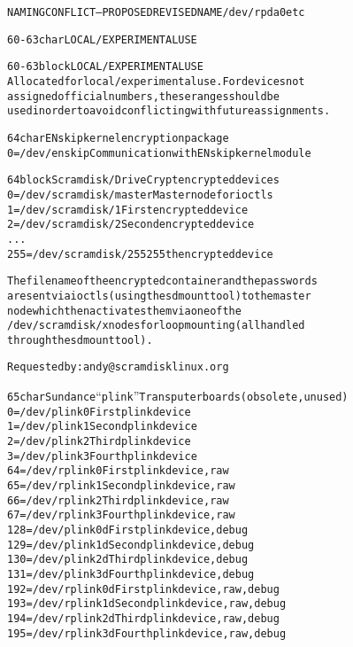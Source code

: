 \documentclass[a4paper,8pt,english]{sphinxmanual}
\begin{document}
\begin{alltt}
                NAMING CONFLICT -- PROPOSED REVISED NAME /dev/rpda0 etc

  60-63 char    LOCAL/EXPERIMENTAL USE

  60-63 block   LOCAL/EXPERIMENTAL USE
                Allocated for local/experimental use.  For devices not
                assigned official numbers, these ranges should be
                used in order to avoid conflicting with future assignments.

  64 char       ENskip kernel encryption package
                  0 = /dev/enskip       Communication with ENskip kernel module

  64 block      Scramdisk/DriveCrypt encrypted devices
                  0 = /dev/scramdisk/master    Master node for ioctls
                  1 = /dev/scramdisk/1         First encrypted device
                  2 = /dev/scramdisk/2         Second encrypted device
                  ...
                255 = /dev/scramdisk/255       255th encrypted device

                The filename of the encrypted container and the passwords
                are sent via ioctls (using the sdmount tool) to the master
                node which then activates them via one of the
                /dev/scramdisk/x nodes for loop mounting (all handled
                through the sdmount tool).

                Requested by: andy@scramdisklinux.org

  65 char       Sundance ``plink'' Transputer boards (obsolete, unused)
                  0 = /dev/plink0       First plink device
                  1 = /dev/plink1       Second plink device
                  2 = /dev/plink2       Third plink device
                  3 = /dev/plink3       Fourth plink device
                 64 = /dev/rplink0      First plink device, raw
                 65 = /dev/rplink1      Second plink device, raw
                 66 = /dev/rplink2      Third plink device, raw
                 67 = /dev/rplink3      Fourth plink device, raw
                128 = /dev/plink0d      First plink device, debug
                129 = /dev/plink1d      Second plink device, debug
                130 = /dev/plink2d      Third plink device, debug
                131 = /dev/plink3d      Fourth plink device, debug
                192 = /dev/rplink0d     First plink device, raw, debug
                193 = /dev/rplink1d     Second plink device, raw, debug
                194 = /dev/rplink2d     Third plink device, raw, debug
                195 = /dev/rplink3d     Fourth plink device, raw, debug


\end{alltt}
\end{document}
